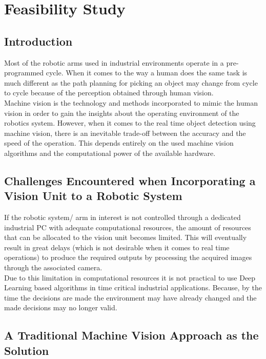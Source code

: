 \documentclass[a4paper,12pt]{book}%
\begin{document}

\tableofcontents




\chapter{Feasibility Study}
\section{Introduction}
Most of the robotic arms used in industrial environments operate in a pre-programmed cycle. When it comes to the way a human does the same task is much different as the path planning for picking an object may change from cycle to cycle because of the perception obtained through human vision.\\

Machine vision is the technology and methods incorporated to mimic the human vision in order to gain the insights about the operating environment of the robotics system. However, when it comes to the real time object detection using machine vision, there is an inevitable trade-off between the accuracy and the speed of the operation. This depends entirely on the used machine vision algorithms and the computational power of the available hardware.

\section{Challenges Encountered when Incorporating  a Vision Unit to a Robotic System}

If the robotic system/ arm in interest is not controlled through a dedicated industrial PC with adequate computational resources, the amount of resources that can be allocated to the vision unit becomes limited.  This will eventually result in great delays (which is not desirable when it comes to real time operations) to produce the required outputs by processing the acquired images through the associated camera.\\

Due to this limitation in computational resources it is not practical to use Deep Learning based algorithms in time critical industrial applications. Because, by the time the decisions are made the environment may have already changed and the made decisions may no longer valid.
\pagebreak
\section{A Traditional Machine Vision Approach as the Solution}
\end{document}
